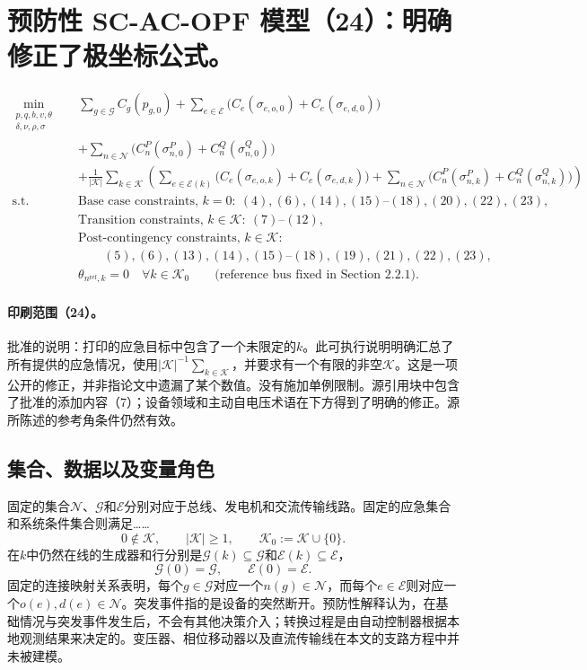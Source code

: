 \documentclass{article}
\begin{document}
\section*{预防性 SC-AC-OPF 模型（24）：明确修正了极坐标公式。}

\begin{equation}
\begin{aligned}
\min_{\substack{p,q,b,v,\theta\\\delta,\nu,\rho,\sigma}}\quad
&\sum_{g\in\mathcal G}C_g(p_{g,0})
 +\sum_{e\in\mathcal E}\bigl(C_e(\sigma_{e,o,0})+C_e(\sigma_{e,d,0})\bigr)\\
&+\sum_{n\in\mathcal N}\bigl(C_n^P(\sigma_{n,0}^P)+C_n^Q(\sigma_{n,0}^Q)\bigr)\\
&+\frac{1}{|\mathcal K|}\sum_{k\in\mathcal K}\left(
 \sum_{e\in\mathcal E(k)}\bigl(C_e(\sigma_{e,o,k})+C_e(\sigma_{e,d,k})\bigr)
 +\sum_{n\in\mathcal N}\bigl(C_n^P(\sigma_{n,k}^P)+C_n^Q(\sigma_{n,k}^Q)\bigr)
 \right)\\
\text{s.t.}\quad
&\text{Base case constraints, }k=0:\ (4),(6),(14),(15)\text{--}(18),(20),(22),(23),\\
&\text{Transition constraints, }k\in\mathcal K:\ (7)\text{--}(12),\\
&\text{Post-contingency constraints, }k\in\mathcal K:\\
&\hspace{2em}(5),(6),(13),(14),(15)\text{--}(18),(19),(21),(22),(23),\\
&\theta_{n^{\mathrm{ref}},k}=0\quad\forall k\in\mathcal K_0
\qquad\text{(reference bus fixed in Section 2.2.1).}
\end{aligned}\tag{24}
\end{equation}

\paragraph{印刷范围（24）。}
批准的说明：打印的应急目标中包含了一个未限定的$k$。此可执行说明明确汇总了所有提供的应急情况，使用$|\mathcal K|^{-1}\sum_{k\in\mathcal K}$，并要求有一个有限的非空$\mathcal K$。这是一项公开的修正，并非指论文中遗漏了某个数值。没有施加单例限制。源引用块中包含了批准的添加内容（7）；设备领域和主动自电压术语在下方得到了明确的修正。源所陈述的参考角条件仍然有效。

\subsection*{集合、数据以及变量角色}
固定的集合$\mathcal N$、$\mathcal G$和$\mathcal E$分别对应于总线、发电机和交流传输线路。固定的应急集合和系统条件集合则满足……
\[
0\notin\mathcal K,\qquad |\mathcal K|\geq1,\qquad
\mathcal K_0:=\mathcal K\cup\{0\}.
\]
在$k$中仍然在线的生成器和行分别是$\mathcal G(k)\subseteq\mathcal G$和$\mathcal E(k)\subseteq\mathcal E$，
\[
\mathcal G(0)=\mathcal G,\qquad \mathcal E(0)=\mathcal E.
\]
固定的连接映射关系表明，每个$g\in\mathcal G$对应一个$n(g)\in\mathcal N$，而每个$e\in\mathcal E$则对应一个$o(e),d(e)\in\mathcal N$。突发事件指的是设备的突然断开。预防性解释认为，在基础情况与突发事件发生后，不会有其他决策介入；转换过程是由自动控制器根据本地观测结果来决定的。变压器、相位移动器以及直流传输线在本文的支路方程中并未被建模。
\end{document}
